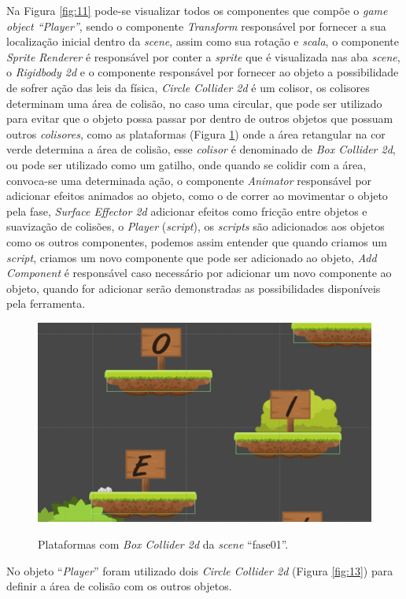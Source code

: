 \documentclass[
	12pt,				%
    oneside,			%
	a4paper,			%
	english,			%
	french,				%
	spanish,			%
	brazil,				%
	]{abntex2}
\begin{document}
			Na Figura \ref{fig:11} pode-se visualizar todos os componentes que compõe o \textit{game} \textit{object “Player”}, sendo o componente \textit{Transform} responsável por fornecer a sua localização inicial dentro da \textit{scene}, assim como sua rotação e \textit{scala}, o componente \textit{Sprite Renderer} é responsável por conter a \textit{sprite} que é visualizada nas aba \textit{scene}, o \textit{Rigidbody 2d} e o componente responsável por fornecer ao objeto a possibilidade de sofrer ação das leis da física, \textit{Circle Collider 2d} é um colisor, os colisores determinam uma área de colisão, no caso uma circular, que pode ser utilizado para evitar que o objeto possa passar por dentro de outros objetos que possuam outros \textit{colisores}, como as plataformas (Figura \ref*{fig:12}) onde a área retangular na cor verde determina a área de colisão, esse \textit{colisor} é denominado de \textit{Box Collider 2d}, ou pode ser utilizado como um gatilho, onde quando se colidir com a área, convoca-se uma determinada ação, o componente \textit{Animator} responsável por adicionar efeitos animados ao objeto, como o de correr ao movimentar o objeto pela fase, \textit{Surface Effector 2d} adicionar efeitos como fricção entre objetos e suavização de colisões, o \textit{Player} (\textit{script}), os \textit{scripts} são adicionados aos objetos como os outros componentes, podemos assim entender que quando criamos um \textit{script}, criamos um novo componente que pode ser adicionado ao objeto, \textit{Add Component} é responsável caso necessário por adicionar um novo componente ao objeto, quando for adicionar serão demonstradas as possibilidades disponíveis pela ferramenta.
				
				\begin{figure}[H]
					\caption{Plataformas com \textit{Box Collider 2d} da \textit{scene} “fase01”.}
					\centering
					\includegraphics[width=0.6\linewidth]{Imagens/12}
					\label{fig:12}
				\end{figure}
				No objeto “\textit{Player}” foram utilizado dois \textit{Circle Collider 2d} (Figura \ref{fig:13}) para definir a área de colisão com os outros objetos.
			
\end{document}
